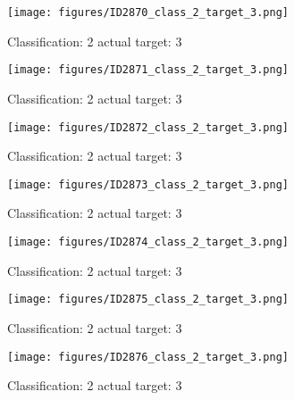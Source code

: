 \begin{figure}[h!]
\begin{center}
\texttt{[image: figures/ID2870\_class\_2\_target\_3.png]}
\end{center}
\caption{ Classification: 2 actual target: 3}
\label{fig:ID2870_class_2_target_3}
\end{figure}
\begin{figure}[h!]
\begin{center}
\texttt{[image: figures/ID2871\_class\_2\_target\_3.png]}
\end{center}
\caption{ Classification: 2 actual target: 3}
\label{fig:ID2871_class_2_target_3}
\end{figure}
\begin{figure}[h!]
\begin{center}
\texttt{[image: figures/ID2872\_class\_2\_target\_3.png]}
\end{center}
\caption{ Classification: 2 actual target: 3}
\label{fig:ID2872_class_2_target_3}
\end{figure}
\begin{figure}[h!]
\begin{center}
\texttt{[image: figures/ID2873\_class\_2\_target\_3.png]}
\end{center}
\caption{ Classification: 2 actual target: 3}
\label{fig:ID2873_class_2_target_3}
\end{figure}
\begin{figure}[h!]
\begin{center}
\texttt{[image: figures/ID2874\_class\_2\_target\_3.png]}
\end{center}
\caption{ Classification: 2 actual target: 3}
\label{fig:ID2874_class_2_target_3}
\end{figure}
\begin{figure}[h!]
\begin{center}
\texttt{[image: figures/ID2875\_class\_2\_target\_3.png]}
\end{center}
\caption{ Classification: 2 actual target: 3}
\label{fig:ID2875_class_2_target_3}
\end{figure}
\begin{figure}[h!]
\begin{center}
\texttt{[image: figures/ID2876\_class\_2\_target\_3.png]}
\end{center}
\caption{ Classification: 2 actual target: 3}
\label{fig:ID2876_class_2_target_3}
\end{figure}
